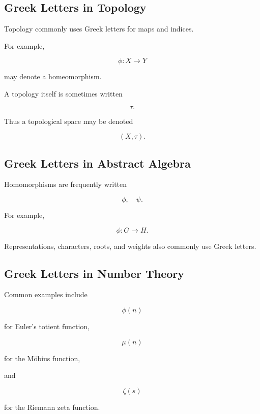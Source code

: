 \subsection{Greek Letters in Topology}
\label{subsec:greek-topology-uses}

Topology commonly uses Greek letters for maps and indices.

For example,

\[
\boxed{
\phi:X\to Y
}
\]

may denote a homeomorphism.

A topology itself is sometimes written

\[
\boxed{
\tau.
}
\]

Thus a topological space may be denoted

\[
\boxed{
(X,\tau).
}
\]

\subsection{Greek Letters in Abstract Algebra}
\label{subsec:greek-algebra-uses}

Homomorphisms are frequently written

\[
\boxed{
\phi,
\quad
\psi.
}
\]

For example,

\[
\boxed{
\phi:G\to H.
}
\]

Representations, characters, roots, and weights also commonly use Greek
letters.

\subsection{Greek Letters in Number Theory}
\label{subsec:greek-number-theory-uses}

Common examples include

\[
\boxed{
\phi(n)
}
\]

for Euler's totient function,

\[
\boxed{
\mu(n)
}
\]

for the M\"obius function,

and

\[
\boxed{
\zeta(s)
}
\]

for the Riemann zeta function.

